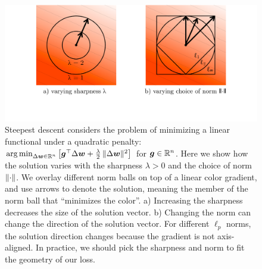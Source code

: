 \begin{figure}
    \centering
    \includegraphics[width=\linewidth,trim={0 3.2cm 0 0},clip]{figure/norms}
    \vspace{-1em}
    \caption{Steepest descent considers the problem of minimizing a linear functional under a quadratic penalty: $\operatorname*{arg\,min}_{\Delta {\bm{w}} \in \mathbb{R}^n} \left[{\bm{g}}^\top \Delta {\bm{w}} + \frac{\lambda}{2} \, \Vert {\Delta {\bm{w}}} \Vert^2 \right]$ for ${\bm{g}} \in \mathbb{R}^n$. Here we show how the solution varies with the sharpness $\lambda > 0$ and the choice of norm $\Vert {\cdot} \Vert$. We overlay different norm balls on top of a linear color gradient, and use arrows to denote the solution, meaning the member of the norm ball that ``minimizes the color''. a) Increasing the sharpness decreases the size of the solution vector. b) Changing the norm can change the direction of the solution vector. For different $\ell_p$ norms, the solution direction changes because the gradient is not axis-aligned. In practice, we should pick the sharpness and norm to fit the geometry of our loss.}
    \label{fig:contours}
\end{figure}
